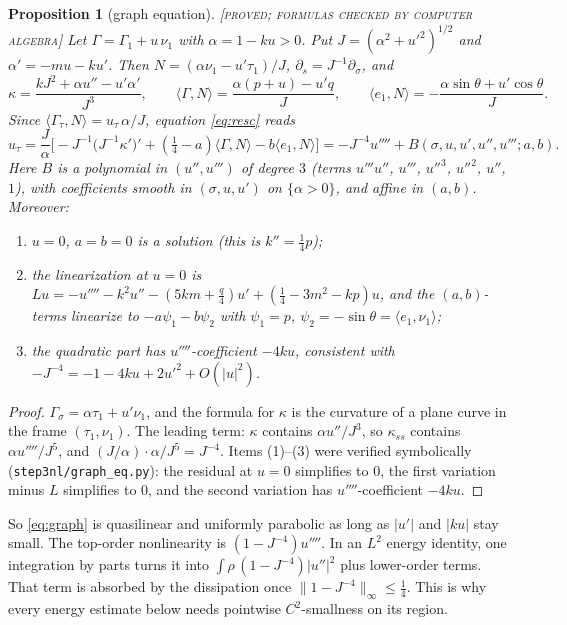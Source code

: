 \documentclass[11pt]{amsart}
\newtheorem{proposition}[theorem]{Proposition}
\theoremstyle{remark}
\newcommand{\ip}[2]{\langle #1,#2\rangle}
\newcommand{\lab}[1]{\textup{\textsc{[#1]}}}
\begin{document}
\begin{proposition}[graph equation]\label{prop:eq}\lab{proved; formulas checked by computer algebra}
Let $\Gamma=\Gamma_1+u\,\nu_1$ with $\alpha=1-ku>0$. Put $J=(\alpha^2+u'^2)^{1/2}$ and $\alpha'=-mu-ku'$. Then $N=(\alpha\nu_1-u'\tau_1)/J$, $\partial_s=J^{-1}\partial_\sigma$, and
\[
\kappa=\frac{kJ^2+\alpha u''-u'\alpha'}{J^3},\qquad \ip{\Gamma}{N}=\frac{\alpha(p+u)-u'q}{J},\qquad \ip{e_1}{N}=-\frac{\alpha\sin\theta+u'\cos\theta}{J}.
\]
Since $\ip{\Gamma_\tau}{N}=u_\tau\,\alpha/J$, equation \eqref{eq:resc} reads
\begin{equation}\label{eq:graph}
u_\tau=\frac{J}{\alpha}\Big[-J^{-1}\big(J^{-1}\kappa'\big)'+(\tfrac14-a)\ip{\Gamma}{N}-b\ip{e_1}{N}\Big]
=-J^{-4}u''''+B(\sigma,u,u',u'',u''';a,b).
\end{equation}
Here $B$ is a polynomial in $(u'',u''')$ of degree $3$ (terms $u'''u''$, $u'''$, $u''^3$, $u''^2$, $u''$, $1$), with coefficients smooth in $(\sigma,u,u')$ on $\{\alpha>0\}$, and affine in $(a,b)$. Moreover:
\begin{enumerate}
\item $u=0$, $a=b=0$ is a solution (this is $k''=\frac14p$);
\item the linearization at $u=0$ is $L u=-u''''-k^2u''-(5km+\frac q4)u'+(\frac14-3m^2-kp)u$, and the $(a,b)$-terms linearize to $-a\psi_1-b\psi_2$ with $\psi_1=p$, $\psi_2=-\sin\theta=\ip{e_1}{\nu_1}$;
\item the quadratic part has $u''''$-coefficient $-4ku$, consistent with $-J^{-4}=-1-4ku+2u'^2+O(|u|^2)$.
\end{enumerate}
\end{proposition}
\begin{proof}
$\Gamma_\sigma=\alpha\tau_1+u'\nu_1$, and the formula for $\kappa$ is the curvature of a plane curve in the frame $(\tau_1,\nu_1)$. The leading term: $\kappa$ contains $\alpha u''/J^3$, so $\kappa_{ss}$ contains $\alpha u''''/J^5$, and $(J/\alpha)\cdot\alpha/J^5=J^{-4}$. Items (1)--(3) were verified symbolically (\texttt{step3nl/graph\_eq.py}): the residual at $u=0$ simplifies to $0$, the first variation minus $L$ simplifies to $0$, and the second variation has $u''''$-coefficient $-4ku$.
\end{proof}

So \eqref{eq:graph} is quasilinear and uniformly parabolic as long as $|u'|$ and $|ku|$ stay small. The top-order nonlinearity is $(1-J^{-4})u''''$. In an $L^2$ energy identity, one integration by parts turns it into $\int\rho\,(1-J^{-4})|u''|^2$ plus lower-order terms. That term is absorbed by the dissipation once $\|1-J^{-4}\|_\infty\le\frac14$. This is why every energy estimate below needs pointwise $C^2$-smallness on its region.
\end{document}
